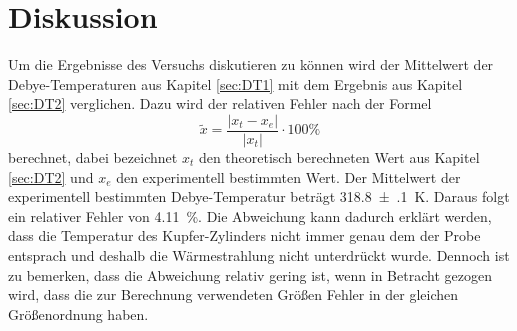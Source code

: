 \section{Diskussion}
\label{sec:Diskussion}
Um die Ergebnisse des Versuchs diskutieren zu können wird der Mittelwert der Debye-Temperaturen 
aus Kapitel \ref{sec:DT1} mit dem Ergebnis aus Kapitel \ref{sec:DT2} verglichen. 
Dazu wird der relativen Fehler nach der Formel
\begin{equation*}
  \tilde{x} = \frac{ \lvert x_{t} - x_{e} \rvert}{\lvert x_{t} \rvert}
  \cdot 100 \%
\label{eq:relf}
\end{equation*}
berechnet, dabei bezeichnet $x_{t}$ den theoretisch berechneten Wert aus Kapitel \ref{sec:DT2} und 
$x_{e}$ den experimentell bestimmten Wert. Der Mittelwert der experimentell bestimmten 
Debye-Temperatur beträgt \SI{318.8(1)}{\kelvin}.
Daraus folgt ein relativer Fehler von \SI{4.11}{\percent}. Die Abweichung kann dadurch erklärt 
werden, dass die Temperatur des Kupfer-Zylinders nicht immer genau dem der Probe entsprach und 
deshalb die Wärmestrahlung nicht unterdrückt wurde. Dennoch ist zu bemerken, dass die Abweichung 
relativ gering ist, wenn in Betracht gezogen wird, dass die zur Berechnung verwendeten Größen 
Fehler in der gleichen Größenordnung haben. 

